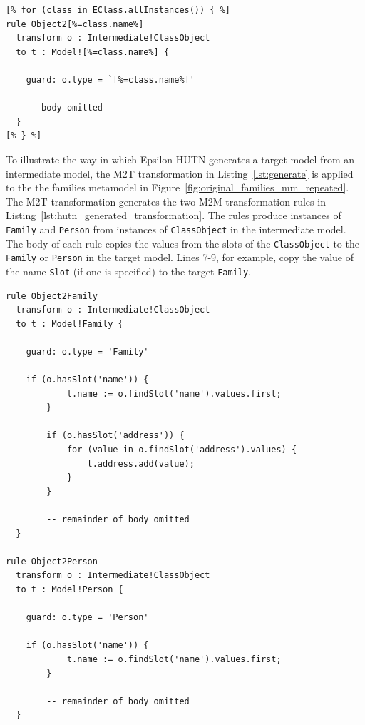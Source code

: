 \begin{lstlisting}[caption={[Higher-order transformation with EGL]Part of the M2T transformation (in EGL) that takes a target metamodel and generates an intermediate model to target model transformation (in ETL).}, label=lst:generate, language=EGL]
[% for (class in EClass.allInstances()) { %]
rule Object2[%=class.name%]
  transform o : Intermediate!ClassObject
  to t : Model![%=class.name%] {

    guard: o.type = `[%=class.name%]'

    -- body omitted
  }
[% } %]
\end{lstlisting}

To illustrate the way in which Epsilon HUTN generates a target model from an intermediate model, the M2T transformation in Listing~\ref{lst:generate} is applied to the the families metamodel in Figure~\ref{fig:original_families_mm_repeated}. The M2T transformation generates the two M2M transformation rules in Listing~\ref{lst:hutn_generated_transformation}. The rules produce instances of \texttt{Fa\-mi\-ly} and \texttt{Pe\-rs\-on} from instances of \texttt{Cl\-a\-ssOb\-je\-ct} in the intermediate model. The body of each rule copies the values from the slots of the \texttt{Cl\-as\-sOb\-je\-ct} to the \texttt{Fa\-mi\-ly} or \texttt{Pe\-rs\-on} in the target model. Lines 7-9, for example, copy the value of the name \texttt{Sl\-ot} (if one is specified) to the target \texttt{Fa\-mi\-ly}.

\begin{lstlisting}[caption=The M2M transformation generated for the Families metamodel, label=lst:hutn_generated_transformation, language=ETL, float=tb]
rule Object2Family
  transform o : Intermediate!ClassObject
  to t : Model!Family {

    guard: o.type = 'Family'

    if (o.hasSlot('name')) {
			t.name := o.findSlot('name').values.first;
		}
		
		if (o.hasSlot('address')) {
			for (value in o.findSlot('address').values) {
				t.address.add(value);
			}
		}
		
		-- remainder of body omitted
  }

rule Object2Person
  transform o : Intermediate!ClassObject
  to t : Model!Person {

    guard: o.type = 'Person'

    if (o.hasSlot('name')) {
			t.name := o.findSlot('name').values.first;
		}
		
		-- remainder of body omitted
  }
\end{lstlisting}

